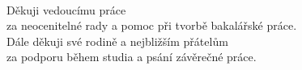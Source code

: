 \thispagestyle{empty}
~
\vfill

\begin{flushright}
    Děkuji vedoucímu práce \vedouciDAT\\ 
    za neocenitelné rady a pomoc při tvorbě bakalářské práce.\\
    Dále děkuji své rodině a nejbližším přátelům\\
    za podporu během studia a psání závěrečné práce.
\end{flushright}

\cleardoublepage
